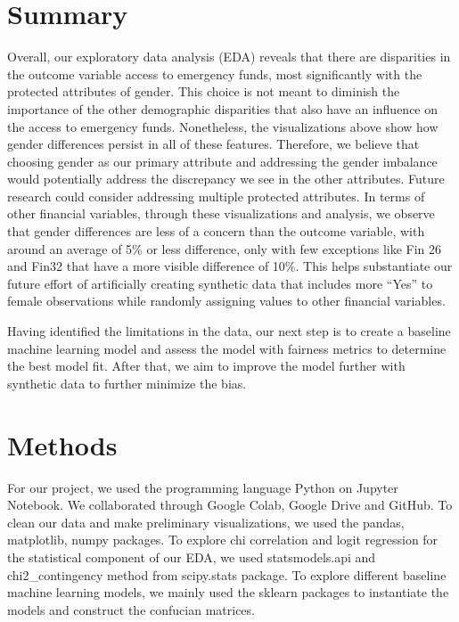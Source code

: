 \documentclass[12pt]{article}
\begin{document}
\hypertarget{summary}{%
\section{Summary}\label{summary}}

Overall, our exploratory data analysis (EDA) reveals that there are
disparities in the outcome variable access to emergency funds, most
significantly with the protected attributes of gender. This choice is
not meant to diminish the importance of the other demographic
disparities that also have an influence on the access to emergency
funds. Nonetheless, the visualizations above show how gender differences
persist in all of these features. Therefore, we believe that choosing
gender as our primary attribute and addressing the gender imbalance
would potentially address the discrepancy we see in the other
attributes. Future research could consider addressing multiple protected
attributes. In terms of other financial variables, through these
visualizations and analysis, we observe that gender differences are less
of a concern than the outcome variable, with around an average of 5\% or
less difference, only with few exceptions like Fin 26 and Fin32 that
have a more visible difference of 10\%. This helps substantiate our
future effort of artificially creating synthetic data that includes more
``Yes'' to female observations while randomly assigning values to other
financial variables.

Having identified the limitations in the data, our next step is to
create a baseline machine learning model and assess the model with
fairness metrics to determine the best model fit. After that, we aim to
improve the model further with synthetic data to further minimize the
bias.

\hypertarget{methods}{%
\section{Methods}\label{methods}}

For our project, we used the programming language Python on Jupyter
Notebook. We collaborated through Google Colab, Google Drive and GitHub.
To clean our data and make preliminary visualizations, we used the
pandas, matplotlib, numpy packages. To explore chi correlation and logit
regression for the statistical component of our EDA, we used
statsmodels.api and chi2\_contingency method from scipy.stats package.
To explore different baseline machine learning models, we mainly used
the sklearn packages to instantiate the models and construct the
confucian matrices.
\end{document}
